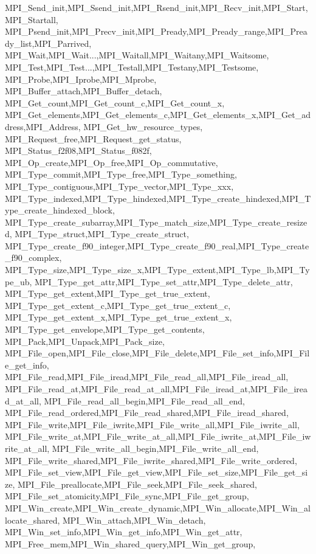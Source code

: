 {{{{{    MPI_Send_init,MPI_Ssend_init,MPI_Rsend_init,MPI_Recv_init,MPI_Start,MPI_Startall,
    MPI_Psend_init,MPI_Precv_init,MPI_Pready,MPI_Pready_range,MPI_Pready_list,MPI_Parrived,
    MPI_Wait,MPI_Wait...,MPI_Waitall,MPI_Waitany,MPI_Waitsome,
    MPI_Test,MPI_Test...,MPI_Testall,MPI_Testany,MPI_Testsome,
    MPI_Probe,MPI_Iprobe,MPI_Mprobe,
    MPI_Buffer_attach,MPI_Buffer_detach,
    MPI_Get_count,MPI_Get_count_c,MPI_Get_count_x,
    MPI_Get_elements,MPI_Get_elements_c,MPI_Get_elements_x,MPI_Get_address,MPI_Address,
    MPI_Get_hw_resource_types,
    MPI_Request_free,MPI_Request_get_status,
    MPI_Status_f2f08,MPI_Status_f082f,
    MPI_Op_create,MPI_Op_free,MPI_Op_commutative,
    MPI_Type_commit,MPI_Type_free,MPI_Type_something,
    MPI_Type_contiguous,MPI_Type_vector,MPI_Type_xxx,
    MPI_Type_indexed,MPI_Type_hindexed,MPI_Type_create_hindexed,MPI_Type_create_hindexed_block,
    MPI_Type_create_subarray,MPI_Type_match_size,MPI_Type_create_resized,
    MPI_Type_struct,MPI_Type_create_struct,
    MPI_Type_create_f90_integer,MPI_Type_create_f90_real,MPI_Type_create_f90_complex,
    MPI_Type_size,MPI_Type_size_x,MPI_Type_extent,MPI_Type_lb,MPI_Type_ub,
    MPI_Type_get_attr,MPI_Type_set_attr,MPI_Type_delete_attr,
    MPI_Type_get_extent,MPI_Type_get_true_extent,
    MPI_Type_get_extent_c,MPI_Type_get_true_extent_c,
    MPI_Type_get_extent_x,MPI_Type_get_true_extent_x,
    MPI_Type_get_envelope,MPI_Type_get_contents,
    MPI_Pack,MPI_Unpack,MPI_Pack_size,
    MPI_File_open,MPI_File_close,MPI_File_delete,MPI_File_set_info,MPI_File_get_info,
    MPI_File_read,MPI_File_iread,MPI_File_read_all,MPI_File_iread_all,
    MPI_File_read_at,MPI_File_read_at_all,MPI_File_iread_at,MPI_File_iread_at_all,
    MPI_File_read_all_begin,MPI_File_read_all_end,
    MPI_File_read_ordered,MPI_File_read_shared,MPI_File_iread_shared,
    MPI_File_write,MPI_File_iwrite,MPI_File_write_all,MPI_File_iwrite_all,
    MPI_File_write_at,MPI_File_write_at_all,MPI_File_iwrite_at,MPI_File_iwrite_at_all,
    MPI_File_write_all_begin,MPI_File_write_all_end,
    MPI_File_write_shared,MPI_File_iwrite_shared,MPI_File_write_ordered,
    MPI_File_set_view,MPI_File_get_view,MPI_File_set_size,MPI_File_get_size,
    MPI_File_preallocate,MPI_File_seek,MPI_File_seek_shared,
    MPI_File_set_atomicity,MPI_File_sync,MPI_File_get_group,
    MPI_Win_create,MPI_Win_create_dynamic,MPI_Win_allocate,MPI_Win_allocate_shared,
    MPI_Win_attach,MPI_Win_detach,
    MPI_Win_set_info,MPI_Win_get_info,MPI_Win_get_attr,
    MPI_Free_mem,MPI_Win_shared_query,MPI_Win_get_group,
}}}}}
